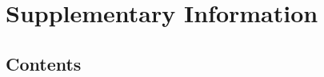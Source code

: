 \clearpage
\setcounter{topnumber}{2}
\setcounter{totalnumber}{3}
\setcounter{figure}{0}
\setcounter{table}{0}
\setcounter{section}{0}

\renewcommand{\thesection}{S\arabic{section}}
\renewcommand{\theHsection}{S\arabic{section}}
\makeatletter
\def\@seccntformat#1{%
  \expandafter\ifx\csname @#1cntformat\endcsname\relax
    \csname the#1\endcsname\quad
  \else
    \csname @#1cntformat\endcsname
  \fi}
\newcommand{\@sectioncntformat}{Supplementary Section \thesection:\quad }
\makeatother

\renewcommand{\figurename}{Supplementary Figure}
\renewcommand{\tablename}{Supplementary Table}
\renewcommand{\thefigure}{S\arabic{figure}}
\renewcommand{\thetable}{S\arabic{table}}
\renewcommand{\theHfigure}{S\arabic{figure}}
\renewcommand{\theHtable}{S\arabic{table}}

\section*{Supplementary Information}

\subsection*{Contents}

